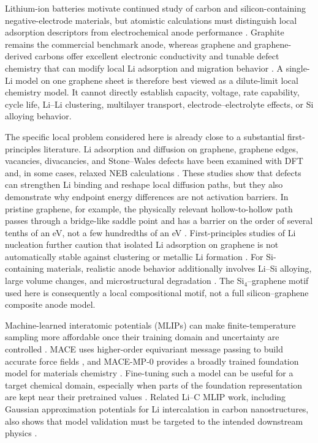 \documentclass[12pt]{article}
\begin{document}
Lithium-ion batteries motivate continued study of carbon and silicon-containing negative-electrode materials, but atomistic calculations must distinguish local adsorption descriptors from electrochemical anode performance \citep{tarascon2001issues,obrovac2014alloy}. Graphite remains the commercial benchmark anode, whereas graphene and graphene-derived carbons offer excellent electronic conductivity and tunable defect chemistry that can modify local Li adsorption and migration behavior \citep{novoselov2004electric,yoo2008graphene}. A single-Li model on one graphene sheet is therefore best viewed as a dilute-limit local chemistry model. It cannot directly establish capacity, voltage, rate capability, cycle life, Li--Li clustering, multilayer transport, electrode--electrolyte effects, or Si alloying behavior.

The specific local problem considered here is already close to a substantial first-principles literature. Li adsorption and diffusion on graphene, graphene edges, vacancies, divacancies, and Stone--Wales defects have been examined with DFT and, in some cases, relaxed NEB calculations \citep{uthaisar2010edge,zhou2012graphene,yildirim2014defect}. These studies show that defects can strengthen Li binding and reshape local diffusion paths, but they also demonstrate why endpoint energy differences are not activation barriers. In pristine graphene, for example, the physically relevant hollow-to-hollow path passes through a bridge-like saddle point and has a barrier on the order of several tenths of an eV, not a few hundredths of an eV \citep{uthaisar2010edge,zhou2012graphene}. First-principles studies of Li nucleation further caution that isolated Li adsorption on graphene is not automatically stable against clustering or metallic Li formation \citep{liu2014nucleation}. For Si-containing materials, realistic anode behavior additionally involves Li--Si alloying, large volume changes, and microstructural degradation \citep{obrovac2014alloy,lin2021silicongraphene,martin2019siliconflg}. The Si$_4$--graphene motif used here is consequently a local compositional motif, not a full silicon--graphene composite anode model.

Machine-learned interatomic potentials (MLIPs) can make finite-temperature sampling more affordable once their training domain and uncertainty are controlled \citep{behler2016perspective,jacobs2025mlipguide}. MACE uses higher-order equivariant message passing to build accurate force fields \citep{batatia2022mace}, and MACE-MP-0 provides a broadly trained foundation model for materials chemistry \citep{batatia2025foundation}. Fine-tuning such a model can be useful for a target chemical domain, especially when parts of the foundation representation are kept near their pretrained values \citep{radova2025finetuning}. Related Li--C MLIP work, including Gaussian approximation potentials for Li intercalation in carbon nanostructures, also shows that model validation must be targeted to the intended downstream physics \citep{fujikake2018gap}.
\end{document}
